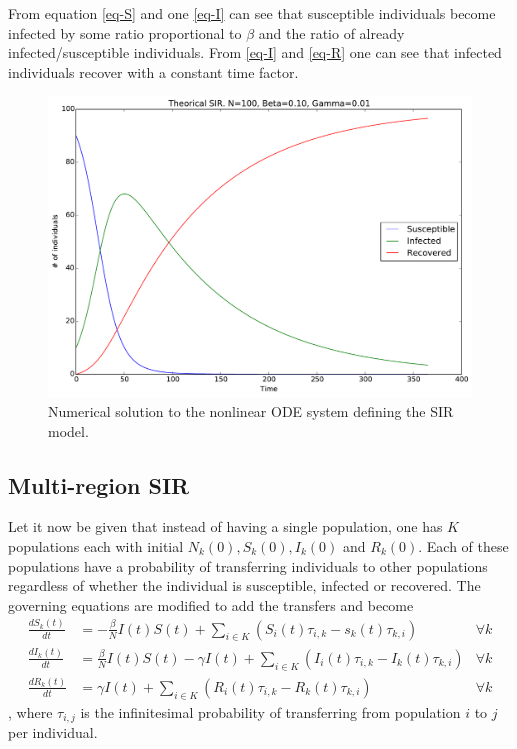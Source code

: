 From equation \eqref{eq-S} and one \eqref{eq-I} can see that susceptible individuals become infected by some ratio proportional to $\beta$ and the ratio of already infected/susceptible individuals. From \eqref{eq-I} and \eqref{eq-R} one can see that infected individuals recover with a constant time factor. 

\begin{figure}[H]
	\centering
	\includegraphics[width= 1.0 \linewidth]{plots/sir_one_region.pdf}
	\caption{Numerical solution to the nonlinear ODE system defining the SIR model.}
\end{figure}

\subsection{Multi-region SIR}
Let it now be given that instead of having a single population, one has $K$ populations each with initial $N_k(0), S_k(0), I_k(0)$ and $R_k(0)$. Each of these populations have a probability of transferring individuals to other populations regardless of whether the individual is susceptible, infected or recovered. The governing equations are modified to add the transfers and become
\begin{align}
\frac{d S_k(t)}{dt} &= - \frac{\beta}{N} I(t) S(t) + \sum_{i\in K} \left( S_i(t)\tau_{i,k} - s_k(t)\tau_{k, i}\right)   &\forall k\\
\frac{d I_k(t)}{dt} &= \frac{\beta}{N} I(t) S(t) - \gamma I(t) + \sum_{i\in K} \left( I_i(t)\tau_{i,k} - I_k(t)\tau_{k, i}\right)  &\forall k\\
\frac{d R_k(t)}{dt} &= \gamma I(t) + \sum_{i\in K} \left( R_i(t)\tau_{i,k} - R_k(t)\tau_{k, i}\right) &\forall k
\end{align}
, where $\tau_{i,j}$ is the infinitesimal probability of transferring from population $i$ to $j$ per individual. 

